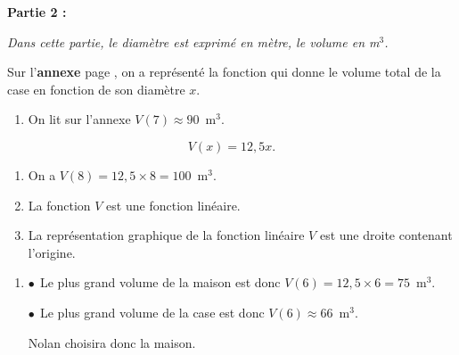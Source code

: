 \textbf{Partie 2 :}

\medskip

\emph{Dans cette partie, le diamètre est exprimé en mètre, le volume en m$^3$.}

\medskip

Sur l'\textbf{annexe } page \pageref{annexe1}, on a représenté la fonction qui donne le volume total de la case en fonction de son diamètre $x$.

\medskip

\begin{enumerate}
\item %

On lit sur l'annexe $V(7) \approx 90$~m$^3$.
\end{enumerate}


\[V(x) = 12,5 x.\]

\begin{enumerate}[resume]
\item %
On a $V(8) = 12,5 \times 8 = 100$~m$^3$.
\item %
La fonction $V$ est une fonction linéaire.
\item %
La représentation graphique de la fonction linéaire $V$ est une droite contenant l'origine.
\end{enumerate}

\begin{enumerate}[resume]
\item %
$\bullet~~$Le plus grand volume de la maison est donc $V(6) = 12,5 \times 6 = 75$~m$^3$.

$\bullet~~$Le plus grand volume de la case est donc $V(6) \approx 66$~m$^3$.

Nolan choisira donc la maison.
\end{enumerate}

